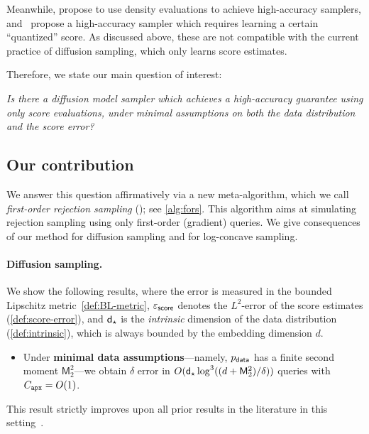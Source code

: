 \documentclass{article} %
\let\oldparagraph\paragraph
\renewcommand{\paragraph}[1]{\oldparagraph{#1.}}
\begin{document}
Meanwhile, \citet{huang2024reverse, wainwright2025score} propose to use density evaluations to achieve high-accuracy samplers, and~\citet{Hua+25QuantizedDiffusion} propose a high-accuracy sampler which requires learning a certain ``quantized'' score.
As discussed above, these are not compatible with the current practice of diffusion sampling, which only learns score estimates.

Therefore, we state our main question of interest:
\begin{center}
    \emph{Is there a diffusion model sampler which achieves a high-accuracy guarantee using only score evaluations, under minimal assumptions on both the data distribution and the score error?}
\end{center}





\subsection{Our contribution}


We answer this question affirmatively via a new meta-algorithm, which we call \emph{first-order rejection sampling} (\AlgWSC); see \cref{alg:fors}.
This algorithm aims at simulating rejection sampling using only first-order (gradient) queries.
We give consequences of our method for diffusion sampling and for log-concave sampling.

\paragraph{Diffusion sampling}
We show the following results, where the error is measured in the bounded Lipschitz metric~\eqref{def:BL-metric}, $\varepsilon_{\mathsf{score}}$ denotes the $L^2$-error of the score estimates (\cref{def:score-error}), and $\mathsf{d}_\star$ is the \emph{intrinsic} dimension of the data distribution (\cref{def:intrinsic}), which is always bounded by the embedding dimension $d$.
\begin{itemize}
    \item Under \textbf{minimal data assumptions}---namely, $p_{\mathsf{data}}$ has a finite second moment $\mathsf M_2^2$---we obtain $\delta$ error in $O(\mathsf{d}_\star\log^3((d+\mathsf M_2^2)/\delta))$ queries with $C_{\texttt{apx}}=O(1)$.
\end{itemize}
This result strictly improves upon all prior results in the literature in this setting~\citep[e.g.,][]{chen2023improved,Ben+24Diffusion,ConDurSil25KLDiffusion,azangulov2024convergence, li2024adapting, li2025dimension, liang2025low, PotAzaDel25Manifold, tang2025adaptivity, HuaWeiChe26LowDim}.
\end{document}
